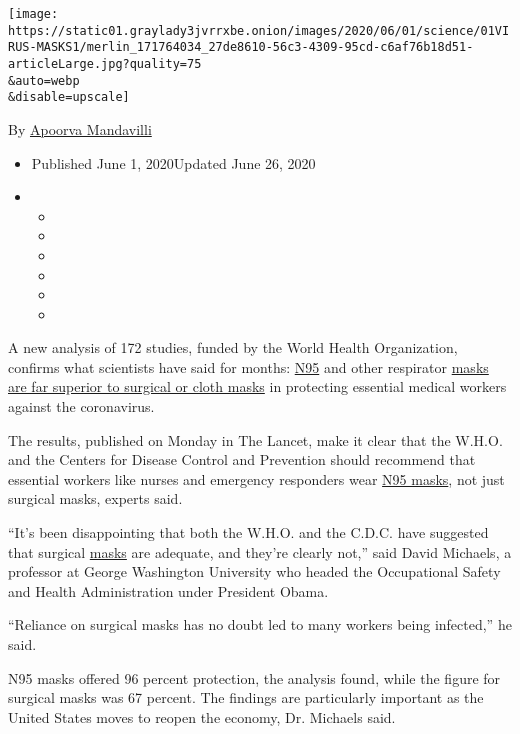 \texttt{[image: https://static01.graylady3jvrrxbe.onion/images/2020/06/01/science/01VIRUS-MASKS1/merlin\_171764034\_27de8610-56c3-4309-95cd-c6af76b18d51-articleLarge.jpg?quality=75\\\&auto=webp\\\&disable=upscale]}

By
\href{https://www.nytimes3xbfgragh.onion/by/apoorva-mandavilli}{Apoorva
Mandavilli}

\begin{itemize}
\item
  Published June 1, 2020Updated June 26, 2020
\item
  \begin{itemize}
  \item
  \item
  \item
  \item
  \item
  \item
  \end{itemize}
\end{itemize}

A new analysis of 172 studies, funded by the World Health Organization,
confirms what scientists have said for months:
\href{https://www.nytimes3xbfgragh.onion/article/face-shield-mask-california-coronavirus.html}{N95}
and other respirator
\href{https://www.nytimes3xbfgragh.onion/article/face-shield-mask-california-coronavirus.html}{masks}
\href{https://doi.org/10.1016/S0140-6736(20)31142-9}{are far superior to
surgical or cloth masks} in protecting essential medical workers against
the coronavirus.

The results, published on Monday in The Lancet, make it clear that the
W.H.O. and the Centers for Disease Control and Prevention should
recommend that essential workers like nurses and emergency responders
wear
\href{https://www.nytimes3xbfgragh.onion/article/face-shield-mask-california-coronavirus.html}{N95
masks}, not just surgical masks, experts said.

``It's been disappointing that both the W.H.O. and the C.D.C. have
suggested that surgical
\href{https://www.nytimes3xbfgragh.onion/2020/06/02/health/coronavirus-face-masks-surveys.html}{masks}
are adequate, and they're clearly not,'' said David Michaels, a
professor at George Washington University who headed the Occupational
Safety and Health Administration under President Obama.

``Reliance on surgical masks has no doubt led to many workers being
infected,'' he said.

N95 masks offered 96 percent protection, the analysis found, while the
figure for surgical masks was 67 percent. The findings are particularly
important as the United States moves to reopen the economy, Dr. Michaels
said.

